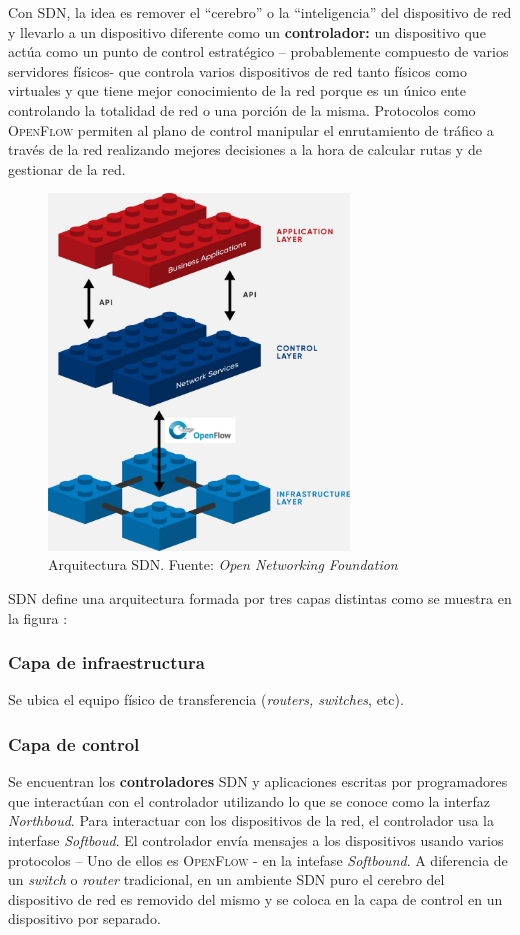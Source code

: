 \documentclass[10pt,journal,compsoc]{IEEEtran}
\begin{document}
Con SDN, la idea es remover el ``cerebro'' o la ``inteligencia'' del dispositivo de red y llevarlo a un dispositivo diferente como un \textbf{controlador:} un dispositivo que actúa como un punto de control estratégico -- probablemente compuesto de varios servidores físicos- que controla varios dispositivos de red tanto físicos como virtuales y que tiene mejor conocimiento de la red porque es un único ente controlando la totalidad de red o una porción de la misma. Protocolos como \textsc{OpenFlow} permiten al plano de control manipular el enrutamiento de tráfico a través de la red realizando mejores decisiones a la hora de calcular rutas y de gestionar de la red.

\begin{figure}[h]
    \centering
    \includegraphics[width=8cm]{sdn-architecture-img}
    \caption{Arquitectura SDN. Fuente: \emph{Open Networking Foundation}}
    \label{fig:sdn-arquitectura}
\end{figure}


SDN define una arquitectura formada por tres capas distintas como se muestra en la figura \pageref{fig:sdn-arquitectura}:
\subsubsection*{Capa de infraestructura}
Se ubica el equipo físico de transferencia (\emph{routers, switches}, etc).

\subsubsection*{Capa de control}
Se encuentran los \textbf{controladores} SDN y aplicaciones escritas por programadores que interactúan con el controlador utilizando lo que se conoce como la interfaz \emph{Northboud}. Para interactuar con los dispositivos de la red, el controlador usa la interfase \emph{Softboud}. El controlador envía mensajes a los dispositivos usando varios protocolos -- Uno de ellos es \textsc{OpenFlow} - en la intefase \emph{Softbound}. A diferencia de un \emph{switch} o \emph{router} tradicional, en un ambiente SDN puro el cerebro del dispositivo de red es removido del mismo y se coloca en la capa de control en un dispositivo por separado.
\end{document}
